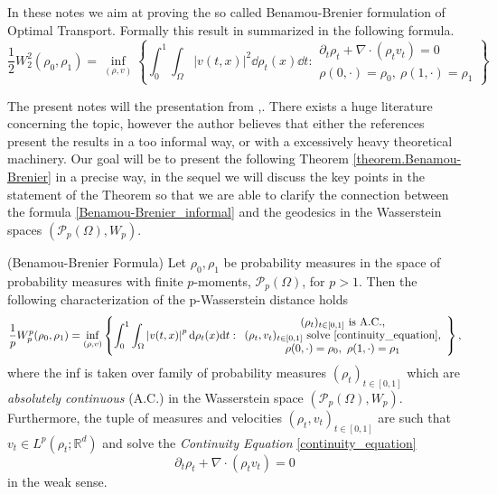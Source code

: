 In these notes we aim at proving the so called Benamou-Brenier formulation of Optimal Transport. Formally this result in summarized in the following formula.
\begin{equation}
\label{Benamou-Brenier_informal}
\tag{BB}
\frac{1}{2}W^2_2(\rho_0, \rho_1) 
= 
\inf_{(\rho, v)}
\left\{
\int_0^1\int_{\Omega}\left|v(t,x)\right|^2 \dd \rho_t(x)\dd t: 
\begin{array}{c}
\partial_t \rho_t + \nabla\cdot\left(\rho_t v_t\right) = 0\\
\rho(0,\cdot) = \rho_0, \ \rho(1, \cdot) = \rho_1 
\end{array}
\right\}
\end{equation}

The present notes will the presentation from \cite{ambrosio2008gradient},\cite{santambrogio2015optimal}. There exists a huge literature concerning the topic, however the author believes that either the references present the results in a too informal way, or with a excessively heavy theoretical machinery. Our goal will be to present the following Theorem \ref{theorem.Benamou-Brenier} in a precise way, in the sequel we will discuss the key points in the statement of the Theorem so that we are able to clarify the connection between the formula \eqref{Benamou-Brenier_informal} and the geodesics in the Wasserstein spaces $\left(\mathcal{P}_p(\Omega), W_p\right)$. 
\begin{theorem}{(Benamou-Brenier Formula)}
	\label{theorem.Benamou-Brenier}
	Let $\rho_0, \rho_1$ be probability measures in the space of probability measures with finite $p$-moments, $\mathcal{P}_p(\Omega)$, for $p>1$. Then the following characterization of the p-Wasserstein distance holds
	\begin{equation*}
	\frac{1}{p}W^p_p(\rho_0, \rho_1) 
	= 
	\mathop{\rm inf}_{(\rho, v)}
	\left\{
	\int_0^1\int_{\Omega}\left|v(t,x)\right|^p {\rm d} \rho_t(x){\rm d} t: 
	\begin{array}{c}
	(\rho_t)_{t \in [0,1]} \text{ is A.C.}, \\
	(\rho_t, v_t)_{t \in [0,1]} \text{ solve \eqref{continuity_equation}},\\
	\rho(0,\cdot) = \rho_0, \ \rho(1, \cdot) = \rho_1 
	\end{array}
	\right\},
	\end{equation*}
	where the inf is taken over family of probability measures $(\rho_t)_{t \in [0,1]}$ which are {\em absolutely continuous} (A.C.) in the Wasserstein space $\left(\mathcal{P}_p(\Omega), W_p\right)$. Furthermore, the tuple of measures and velocities $(\rho_t, v_t)_{t \in [0,1]}$ are such that $v_t \in L^p(\rho_t;\mathbb{R}^d)$ and solve the {\em Continuity Equation} \eqref{continuity_equation} 
	\begin{equation}
	\label{continuity_equation}
	\tag{CE}
	\partial_t \rho_t + \nabla\cdot\left(\rho_t v_t\right) = 0
	\end{equation}
	in the weak sense. 
\end{theorem} 

